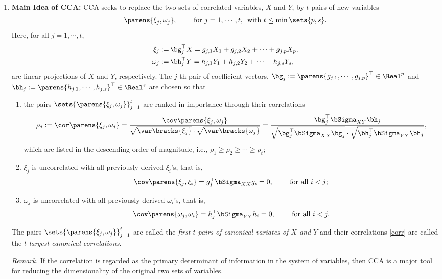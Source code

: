\documentclass[12pt]{article}
\begin{document}
\begin{enumerate}[label=\textbf{\arabic*.}]
	\item \textbf{Main Idea of CCA:} CCA seeks to replace the two sets of correlated variables, $X$ and $Y$, by $t$ pairs of new variables 
	\begin{align*}
		\parens{\xi_j, \omega_j}, \qquad \text{ for } j = 1, \cdots, t, \, \text{ with } t \le \min \sets{p, s}.  
	\end{align*}
	Here, for all $j = 1, \cdots, t$, 
	\begin{align*}
		\xi_j := & \, \bg_j^\top X = g_{j,1} X_1 + g_{j,2} X_2 + \cdots + g_{j,p} X_p, \\
		\omega_j := & \, \bh_j^\top Y = h_{j,1} Y_1 + h_{j,2} Y_2 + \cdots + h_{j,s} Y_s, 
	\end{align*}
	are linear projections of $X$ and $Y$, respectively. The $j$-th pair of coefficient vectors, $\bg_j := \parens{g_{j,1}, \cdots, g_{j,p}}^\top \in \Real^p$ and $\bh_j := \parens{h_{j,1}, \cdots, h_{j,s}}^\top \in \Real^s$ are chosen so that 
	\begin{enumerate}
		\item the pairs $\sets{\parens{\xi_j, \omega_j}}_{j=1}^t$ are ranked in importance through their correlations
		\begin{align}\label{corr}
			\rho_j := \cor \parens{\xi_j, \omega_j} = \frac{\cov \parens{\xi_j, \omega_j}}{\sqrt{\var \bracks{\xi_j}} \cdot \sqrt{\var \bracks{\omega_j}}} = \frac{\bg_j^\top \bSigma_{XY} \bh_j}{\sqrt{\bg_j^\top \bSigma_{XX} \bg_j} \cdot \sqrt{\bh_j^\top \bSigma_{YY} \bh_j}}, 
		\end{align}
		which are listed in the descending order of magnitude, i.e., $\rho_1 \ge \rho_2 \ge \cdots \ge \rho_t$; 
		\item $\xi_j$ is uncorrelated with all previously derived $\xi_i$'s, that is, 
		\begin{align}
			\cov \parens{\xi_j, \xi_i} = g_j^\top \bSigma_{XX} g_i = 0, \qquad \text{ for all } i < j; 
		\end{align}
		\item $\omega_j$ is uncorrelated with all previously derived $\omega_i$'s, that is, 
		\begin{align}
			\cov \parens{\omega_j, \omega_i} = h_j^\top \bSigma_{YY} h_i = 0, \qquad \text{ for all } i < j. 
		\end{align}
	\end{enumerate}
	The pairs $\sets{\parens{\xi_j, \omega_j}}_{j=1}^t$ are called the \textit{first $t$ pairs of canonical variates of $X$ and $Y$} and their correlations \eqref{corr} are called the \textit{$t$ largest canonical correlations}. 
	
	\textit{Remark.} If the correlation is regarded as the primary determinant of information in the system of variables, then CCA is a major tool for reducing the dimensionality of the original two sets of variables. 

\end{enumerate}
\end{document}
